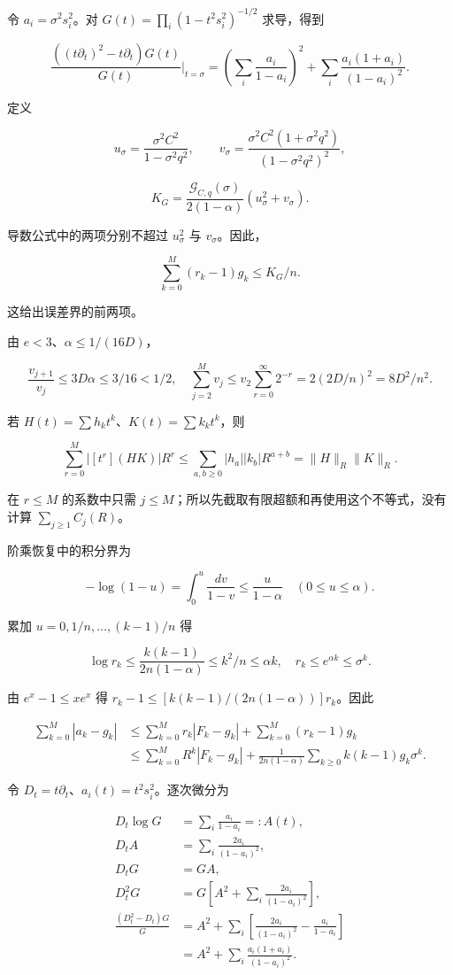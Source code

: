 \documentclass[11pt,a4paper]{article}
\begin{document}
令 \(a_i=\sigma^2s_i^2\)。对 \(G(t)=\prod_i(1-t^2s_i^2)^{-1/2}\) 求导，得到

\[
\frac{\left((t\partial_t)^2-t\partial_t\right)G(t)}{G(t)}
\bigg|_{t=\sigma}
=\left(\sum_i\frac{a_i}{1-a_i}\right)^2
+\sum_i\frac{a_i(1+a_i)}{(1-a_i)^2}.
\]

定义

\[
u_\sigma=\frac{\sigma^2C^2}{1-\sigma^2q^2},
\qquad
v_\sigma=\frac{\sigma^2C^2(1+\sigma^2q^2)}
{(1-\sigma^2q^2)^2},
\]

\[
K_G=\frac{\mathcal G_{C,q}(\sigma)}{2(1-\alpha)}
\left(u_\sigma^2+v_\sigma\right).
\]

导数公式中的两项分别不超过 \(u_\sigma^2\) 与 \(v_\sigma\)。因此，

\[
\sum_{k=0}^{M}(r_k-1)g_k\le K_G/n.
\]

这给出误差界的前两项。

由 \(e<3\)、\(\alpha\le1/(16D)\)，

\[
\frac{v_{j+1}}{v_j}\le3D\alpha\le3/16<1/2,
\quad
\sum_{j=2}^Mv_j\le v_2\sum_{r=0}^{\infty}2^{-r}
=2(2D/n)^2=8D^2/n^2.
\]

若 \(H(t)=\sum h_kt^k\)、\(K(t)=\sum k_kt^k\)，则

\[
\sum_{r=0}^M|[t^r](HK)|R^r
\le\sum_{a,b\ge0}|h_a||k_b|R^{a+b}
=\|H\|_R\|K\|_R.
\]

在 \(r\le M\) 的系数中只需 \(j\le M\)；所以先截取有限超额和再使用这个不等式，没有计算 \(\sum_{j\ge1}C_j(R)\)。

阶乘恢复中的积分界为

\[
-\log(1-u)=\int_0^u\frac{dv}{1-v}\le\frac{u}{1-\alpha}
\quad(0\le u\le\alpha).
\]

累加 \(u=0,1/n,\ldots,(k-1)/n\) 得

\[
\log r_k\le\frac{k(k-1)}{2n(1-\alpha)}\le k^2/n\le\alpha k,
\quad r_k\le e^{\alpha k}\le\sigma^k.
\]

由 \(e^x-1\le xe^x\) 得 \(r_k-1\le[k(k-1)/(2n(1-\alpha))]r_k\)。因此

\[
\begin{aligned}
\sum_{k=0}^M|a_k-g_k|
&\le\sum_{k=0}^Mr_k|F_k-g_k|+\sum_{k=0}^M(r_k-1)g_k\\
&\le\sum_{k=0}^MR^k|F_k-g_k|
+\frac1{2n(1-\alpha)}\sum_{k\ge0}k(k-1)g_k\sigma^k.
\end{aligned}
\]

令 \(D_t=t\partial_t\)、\(a_i(t)=t^2s_i^2\)。逐次微分为

\[
\begin{aligned}
D_t\log G&=\sum_i\frac{a_i}{1-a_i}=:A(t),\\
D_tA&=\sum_i\frac{2a_i}{(1-a_i)^2},\\
D_tG&=GA,\\
D_t^2G&=G\left[A^2+\sum_i\frac{2a_i}{(1-a_i)^2}\right],\\
\frac{(D_t^2-D_t)G}{G}
&=A^2+\sum_i\left[\frac{2a_i}{(1-a_i)^2}-\frac{a_i}{1-a_i}\right]\\
&=A^2+\sum_i\frac{a_i(1+a_i)}{(1-a_i)^2}.
\end{aligned}
\]
\end{document}
